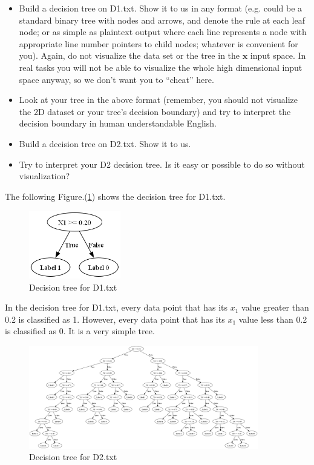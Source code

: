 \documentclass[a4paper]{article}
\theoremstyle{definition}
\def\x{\mathbf x}
\newenvironment{soln}{
    \leavevmode\color{blue}\ignorespaces
}{}
\begin{document}
\begin{enumerate}
\begin{itemize}
  \item Build a decision tree on D1.txt.  Show it to us in any format (e.g. could be a standard binary tree with nodes and arrows, and denote the rule at each leaf node; or as simple as plaintext output where each line represents a node with appropriate line number pointers to child nodes; whatever is convenient for you). Again, do not visualize the data set or the tree in the $\x$ input space.  In real tasks you will not be able to visualize the whole high dimensional input space anyway, so we don't want you to ``cheat'' here. 
  
  \item Look at your tree in the above format (remember, you should not visualize the 2D dataset or your tree's decision boundary) and try to interpret the decision boundary in human understandable English. 
  
  \item Build a decision tree on D2.txt.  Show it to us. 
  
  \item Try to interpret your D2 decision tree. Is it easy or possible to do so without visualization? \\
  
  \end{itemize}

  \begin{soln}
    The following Figure.(\ref{fig:q2_5}) shows the decision tree for D1.txt. \\
    \begin{figure}[H]
      \centering
      \includegraphics[width=4cm]{d1_vis.png}
      \caption{Decision tree for D1.txt}
      \label{fig:q2_5}
    \end{figure}
  
    In the decision tree for D1.txt, every data point that has its $x_1$ value greater than 0.2 is classified as 1. However, every data point that has its $x_1$ value less than 0.2 is classified as 0. It is  a very simple tree.\\

    \begin{figure}[H]
      \centering
      \includegraphics[width=10cm]{d2_vis.png}
      \caption{Decision tree for D2.txt}
      \label{fig:q2_6}
    \end{figure}
    

\end{soln}
\end{enumerate}
\end{document}

